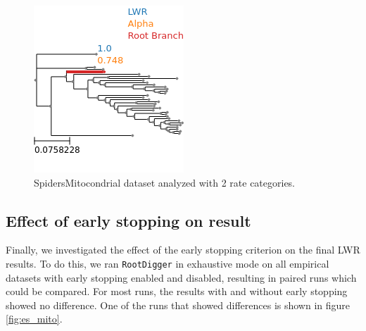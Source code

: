 \documentclass{article}
\newcommand{\RootDiggertt}{\texttt{RootDigger}}
\begin{document}
\begin{figure}
  \begin{center}
    \includegraphics[width=.75\linewidth]{figs/spiders/2rate.png}
    \caption{SpidersMitocondrial dataset analyzed with 2 rate categories.}
    \label{fig:spiders2rate}
  \end{center}
\end{figure}

\subsection{Effect of early stopping on result}

Finally, we investigated the effect of the early stopping criterion on the
final LWR results. To do this, we ran \RootDiggertt{} in exhaustive mode on all
empirical datasets with early stopping enabled and disabled, resulting in paired
runs which could be compared. For most runs, the results with and without
early stopping showed no difference. One of the runs that showed differences is
shown in figure \ref{fig:es_mito}.
\end{document}
